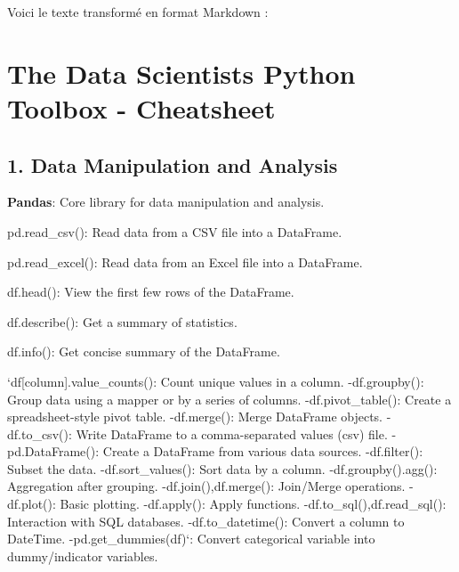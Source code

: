 Voici le texte transformé en format Markdown \+:

\section*{The Data Scientist\textquotesingle{}s Python Toolbox -\/ Cheatsheet}

\subsection*{1. Data Manipulation and Analysis}


\begin{DoxyItemize}
\item {\bfseries Pandas}\+: Core library for data manipulation and analysis.
\begin{DoxyItemize}
\item {\ttfamily pd.\+read\+\_\+csv()}\+: Read data from a C\+SV file into a Data\+Frame.
\item {\ttfamily pd.\+read\+\_\+excel()}\+: Read data from an Excel file into a Data\+Frame.
\item {\ttfamily df.\+head()}\+: View the first few rows of the Data\+Frame.
\item {\ttfamily df.\+describe()}\+: Get a summary of statistics.
\item {\ttfamily df.\+info()}\+: Get concise summary of the Data\+Frame.
\item `df\mbox{[}\textquotesingle{}column\textquotesingle{}\mbox{]}.value\+\_\+counts(){\ttfamily \+: Count unique values in a column. -\/}df.\+groupby(){\ttfamily \+: Group data using a mapper or by a series of columns. -\/}df.\+pivot\+\_\+table(){\ttfamily \+: Create a spreadsheet-\/style pivot table. -\/}df.\+merge(){\ttfamily \+: Merge Data\+Frame objects. -\/}df.\+to\+\_\+csv(){\ttfamily \+: Write Data\+Frame to a comma-\/separated values (csv) file. -\/}pd.\+Data\+Frame(){\ttfamily \+: Create a Data\+Frame from various data sources. -\/}df.\+filter(){\ttfamily \+: Subset the data. -\/}df.\+sort\+\_\+values(){\ttfamily \+: Sort data by a column. -\/}df.\+groupby().agg(){\ttfamily \+: Aggregation after grouping. -\/}df.\+join(){\ttfamily ,}df.\+merge(){\ttfamily \+: Join/\+Merge operations. -\/}df.\+plot(){\ttfamily \+: Basic plotting. -\/}df.\+apply(){\ttfamily \+: Apply functions. -\/}df.\+to\+\_\+sql(){\ttfamily ,}df.\+read\+\_\+sql(){\ttfamily \+: Interaction with S\+QL databases. -\/}df.\+to\+\_\+datetime(){\ttfamily \+: Convert a column to Date\+Time. -\/}pd.\+get\+\_\+dummies(df)`\+: Convert categorical variable into dummy/indicator variables.
\end{DoxyItemize}
\end{DoxyItemize}

